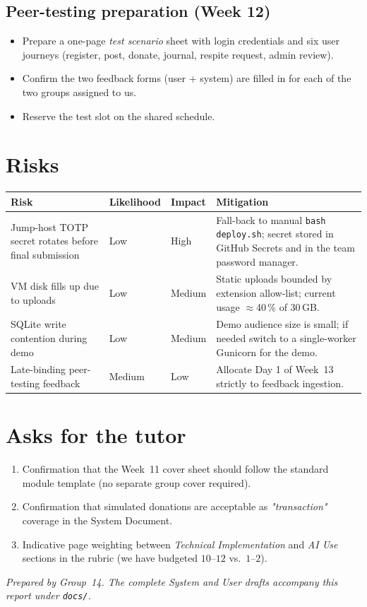 \subsection*{Peer-testing preparation (Week 12)}
\begin{itemize}
  \item Prepare a one-page \emph{test scenario} sheet with login
        credentials and six user journeys (register, post, donate,
        journal, respite request, admin review).
  \item Confirm the two feedback forms (user + system) are filled in
        for each of the two groups assigned to us.
  \item Reserve the test slot on the shared schedule.
\end{itemize}

\section{Risks}

\begin{tabularx}{\linewidth}{@{} L{4.6cm} l l X @{}}
  \toprule
  \textbf{Risk} & \textbf{Likelihood} & \textbf{Impact} & \textbf{Mitigation} \\
  \midrule
  Jump-host TOTP secret rotates before final submission
    & Low & High
    & Fall-back to manual \texttt{bash deploy.sh}; secret stored in
      GitHub Secrets and in the team password manager. \\
  VM disk fills up due to uploads
    & Low & Medium
    & Static uploads bounded by extension allow-list; current usage
      $\approx$40\,\% of 30\,GB. \\
  SQLite write contention during demo
    & Low & Medium
    & Demo audience size is small; if needed switch to a single-worker
      Gunicorn for the demo. \\
  Late-binding peer-testing feedback
    & Medium & Low
    & Allocate Day 1 of Week~13 strictly to feedback ingestion. \\
  \bottomrule
\end{tabularx}

\section{Asks for the tutor}

\begin{enumerate}
  \item Confirmation that the Week~11 cover sheet should follow the
        standard module template (no separate group cover required).
  \item Confirmation that simulated donations are acceptable as
        \emph{"transaction"} coverage in the System Document.
  \item Indicative page weighting between \emph{Technical Implementation}
        and \emph{AI Use} sections in the rubric (we have budgeted
        $10$–$12$ vs.\ $1$–$2$).
\end{enumerate}

\vspace{0.6cm}
\noindent
\textit{Prepared by Group~14. The complete System and User drafts
accompany this report under \texttt{docs/}.}


